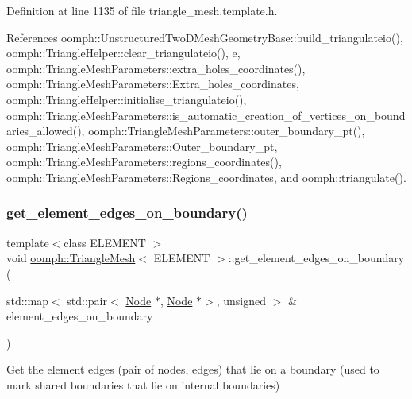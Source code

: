 Definition at line 1135 of file triangle\+\_\+mesh.\+template.\+h.



References oomph\+::\+Unstructured\+Two\+D\+Mesh\+Geometry\+Base\+::build\+\_\+triangulateio(), oomph\+::\+Triangle\+Helper\+::clear\+\_\+triangulateio(), e, oomph\+::\+Triangle\+Mesh\+Parameters\+::extra\+\_\+holes\+\_\+coordinates(), oomph\+::\+Triangle\+Mesh\+Parameters\+::\+Extra\+\_\+holes\+\_\+coordinates, oomph\+::\+Triangle\+Helper\+::initialise\+\_\+triangulateio(), oomph\+::\+Triangle\+Mesh\+Parameters\+::is\+\_\+automatic\+\_\+creation\+\_\+of\+\_\+vertices\+\_\+on\+\_\+boundaries\+\_\+allowed(), oomph\+::\+Triangle\+Mesh\+Parameters\+::outer\+\_\+boundary\+\_\+pt(), oomph\+::\+Triangle\+Mesh\+Parameters\+::\+Outer\+\_\+boundary\+\_\+pt, oomph\+::\+Triangle\+Mesh\+Parameters\+::regions\+\_\+coordinates(), oomph\+::\+Triangle\+Mesh\+Parameters\+::\+Regions\+\_\+coordinates, and oomph\+::triangulate().

\mbox{\label{classoomph_1_1TriangleMesh_a9eecb633a813252086fd7fd9ba0b2635}} 
\subsubsection{\texorpdfstring{get\+\_\+element\+\_\+edges\+\_\+on\+\_\+boundary()}{get\_element\_edges\_on\_boundary()}}
{\footnotesize\ttfamily template$<$class E\+L\+E\+M\+E\+NT $>$ \\
void \hyperlink{classoomph_1_1TriangleMesh}{oomph\+::\+Triangle\+Mesh}$<$ E\+L\+E\+M\+E\+NT $>$\+::get\+\_\+element\+\_\+edges\+\_\+on\+\_\+boundary (\begin{DoxyParamCaption}\item[{std\+::map$<$ std\+::pair$<$ \hyperlink{classoomph_1_1Node}{Node} $\ast$, \hyperlink{classoomph_1_1Node}{Node} $\ast$$>$, unsigned $>$ \&}]{element\+\_\+edges\+\_\+on\+\_\+boundary }\end{DoxyParamCaption})\hspace{0.3cm}{\ttfamily [protected]}}



Get the element edges (pair of nodes, edges) that lie on a boundary (used to mark shared boundaries that lie on internal boundaries) 



